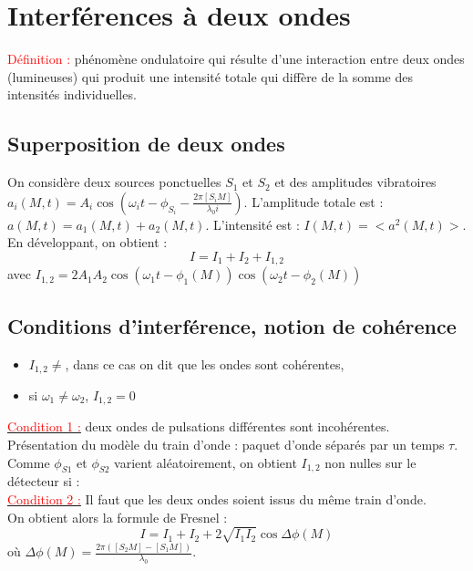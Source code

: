 \documentclass[11pt]{report}
\numberwithin{figure}{section}
\numberwithin{equation}{section}
\numberwithin{table}{section}
\newcommand{\1}{\boldsymbol{1}}
\begin{document}
  \section{Interférences à deux ondes}
  \textcolor{red}{Définition :} phénomène ondulatoire qui résulte d'une interaction entre deux ondes (lumineuses) qui produit une intensité totale qui diffère de la somme des intensités individuelles.
  \subsection{Superposition de deux ondes}
  On considère deux sources ponctuelles $S_1$ et $S_2$ et des amplitudes vibratoires $a_i(M,t)=A_i\cos\left(\omega_it-\phi_{S_i} - \frac{2\pi[S_iM]}{\lambda_0i}\right)$. L'amplitude totale est : $a(M,t)=a_1(M,t)+a_2(M,t)$. L'intensité est : $I(M,t) = <a^2(M,t)>$.\\

  En développant, on obtient :
  \begin{equation}
      I = I_1 + I_2 + I_{1,2}
  \end{equation}
  avec $I_{1,2} = 2A_1A_2\cos\left(\omega_1t-\phi_1(M)\right)\cos\left(\omega_2t-\phi_2(M)\right)$

  \subsection{Conditions d'interférence, notion de cohérence}
  \begin{itemize}
      \item $I_{1,2}\neq$, dans ce cas on dit que les ondes sont cohérentes,
      \item si $\omega_1\neq\omega_2$, $I_{1,2}=0$
  \end{itemize}

  \underline{\textcolor{red}{Condition 1 :}} deux ondes de pulsations différentes sont incohérentes.\\

  Présentation du modèle du train d'onde : paquet d'onde séparés par un temps $\tau$. Comme $\phi_{S1}$ et $\phi_{S2}$ varient aléatoirement, on obtient $I_{1,2}$ non nulles sur le détecteur si : \\
  
  \underline{\textcolor{red}{Condition 2 :}} Il faut que les deux ondes soient issus du même train d'onde. \\

  On obtient alors la formule de Fresnel :
  \begin{equation}
      I = I_1 + I_2 + 2\sqrt{I_1I_2}\cos{\Delta\phi(M)}  \end{equation}
      où $\Delta\phi(M) = \frac{2\pi([S_2M]-[S_1M])}{\lambda_0}$.
\end{document}
